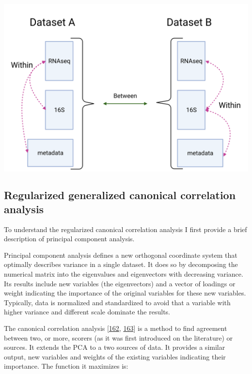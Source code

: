 \documentclass[
  12pt,
  a4paper,
  twoside,
  openright]{book}
\let\origfigure\figure
\let\endorigfigure\endfigure
\renewenvironment{figure}[1][2] {
    \expandafter\origfigure\expandafter[!ht]
} {
    \endorigfigure
}
\begin{document}
\begin{figure}
\includegraphics[width=1\linewidth]{images/multiomic_datasets} \caption[Multiomic relationships.]{Multiomic relationships on different datasets. Integration methods focus on relationships within datasets. Common relationships between datasets are used as confirmation/validation. Created with BioRender.com}\label{fig:multiomic-datasets}
\end{figure}

\hypertarget{regularized-generalized-canonical-correlation-analysis}{%
\subsection{Regularized generalized canonical correlation analysis}\label{regularized-generalized-canonical-correlation-analysis}}

To understand the regularized canonical correlation analysis I first provide a brief description of principal component analysis.

Principal component analysis defines a new orthogonal coordinate system that optimally describes variance in a single dataset.
It does so by decomposing the numerical matrix into the eigenvalues and eigenvectors with decreasing variance.
Its results include new variables (the eigenvectors) and a vector of loadings or weight indicating the importance of the original variables for these new variables.
Typically, data is normalized and standardized to avoid that a variable with higher variance and different scale dominate the results.

The canonical correlation analysis {[}\protect\hyperlink{ref-jordan1875}{162}, \protect\hyperlink{ref-hotelling1936}{163}{]} is a method to find agreement between two, or more, scorers (as it was first introduced on the literature) or sources.
It extends the PCA to a two sources of data.
It provides a similar output, new variables and weights of the existing variables indicating their importance.
The function it maximizes is:
\end{document}
